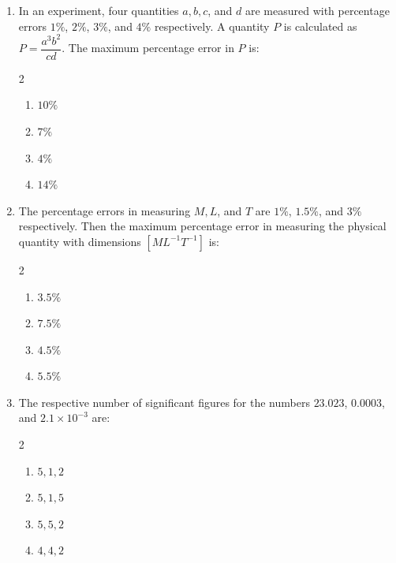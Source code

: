 \documentclass[11pt,a4paper]{article}
\begin{document}
\begin{enumerate}[label=\textbf{\textcolor{l1Green}{Q\arabic*.}},leftmargin=24pt,itemsep=10pt]
  \item In an experiment, four quantities $a, b, c$, and $d$ are measured with percentage errors $1\%$, $2\%$, $3\%$, and $4\%$ respectively. A quantity $P$ is calculated as $P = \dfrac{a^3 b^2}{c d}$. The maximum percentage error in $P$ is:
  \begin{multicols}{2}
  \begin{enumerate}[label=\textbf{\textcolor{primaryDark}{(\Alph*)}},itemsep=2pt]
    \item $10\%$
    \item $7\%$
    \item $4\%$
    \item $14\%$
  \end{enumerate}
  \end{multicols}

  \item The percentage errors in measuring $M, L$, and $T$ are $1\%$, $1.5\%$, and $3\%$ respectively. Then the maximum percentage error in measuring the physical quantity with dimensions $[M L^{-1} T^{-1}]$ is:
  \begin{multicols}{2}
  \begin{enumerate}[label=\textbf{\textcolor{primaryDark}{(\Alph*)}},itemsep=2pt]
    \item $3.5\%$
    \item $7.5\%$
    \item $4.5\%$
    \item $5.5\%$
  \end{enumerate}
  \end{multicols}

  \item The respective number of significant figures for the numbers $23.023$, $0.0003$, and $2.1 \times 10^{-3}$ are:
  \begin{multicols}{2}
  \begin{enumerate}[label=\textbf{\textcolor{primaryDark}{(\Alph*)}},itemsep=2pt]
    \item $5, 1, 2$
    \item $5, 1, 5$
    \item $5, 5, 2$
    \item $4, 4, 2$
  \end{enumerate}
  \end{multicols}


\end{enumerate}
\end{document}
